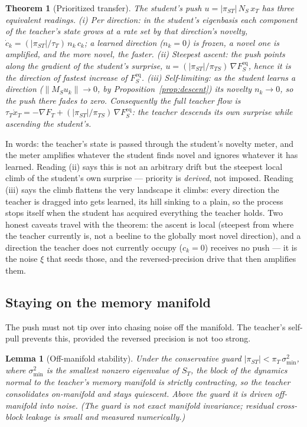 \documentclass[10pt,letterpaper]{article}
\theoremstyle{plain}
\newtheorem{theorem}{Theorem}
\newtheorem{lemma}{Lemma}
\theoremstyle{remark}
\newcommand{\xT}{x_T}
\newcommand{\MS}{M_S}
\newcommand{\ST}{S_T}
\newcommand{\NS}{N_S}
\newcommand{\FSeq}{F_S^{\mathrm{eq}}}
\newcommand{\FT}{F_T}
\newcommand{\piT}{\pi_T}
\newcommand{\piTS}{\pi_{TS}}
\newcommand{\piST}{\pi_{ST}}
\newcommand{\tauT}{\tau_T}
\begin{document}
\begin{theorem}[Prioritized transfer]
\label{thm:prioritized}
The student's push $u=|\piST|\,\NS\,\xT$ has three equivalent readings.
\emph{(i) Per direction:} in the student's eigenbasis each component of the teacher's state grows at a
rate set by that direction's novelty, $\dot c_k=(|\piST|/\tauT)\,n_k\,c_k$; a learned direction
($n_k=0$) is frozen, a novel one is amplified, and the more novel, the faster.
\emph{(ii) Steepest ascent:} the push points along the gradient of the student's surprise,
$u=(|\piST|/\piTS)\,\nabla\FSeq$, hence it is the direction of fastest increase of $\FSeq$.
\emph{(iii) Self-limiting:} as the student learns a direction ($\|\MS u_k\|\!\to\!0$, by
Proposition~\ref{prop:descent}) its novelty $n_k\!\to\!0$, so the push there fades to zero.
Consequently the full teacher flow is
$\tauT\dot\xT=-\nabla\FT+(|\piST|/\piTS)\,\nabla\FSeq$: the teacher descends its own surprise while
ascending the student's.
\end{theorem}

In words: the teacher's state is passed through the student's novelty meter, and the meter amplifies
whatever the student finds novel and ignores whatever it has learned. Reading (ii) says this is not an
arbitrary drift but the steepest local climb of the student's own surprise --- priority is
\emph{derived}, not imposed. Reading (iii) says the climb flattens the very landscape it climbs: every
direction the teacher is dragged into gets learned, its hill sinking to a plain, so the process stops
itself when the student has acquired everything the teacher holds. Two honest caveats travel with the
theorem: the ascent is local (steepest from where the teacher currently is, not a beeline to the globally
most novel direction), and a direction the teacher does not currently occupy ($c_k=0$) receives no push
--- it is the noise $\xi$ that seeds those, and the reversed-precision drive that then amplifies them.

\subsection{Staying on the memory manifold}
The push must not tip over into chasing noise off the manifold. The teacher's self-pull prevents this,
provided the reversed precision is not too strong.

\begin{lemma}[Off-manifold stability]
\label{lem:normal}
Under the conservative guard $|\piST| < \piT\,\sigma_{\min}^{2}$, where $\sigma_{\min}^{2}$ is the
smallest nonzero eigenvalue of $\ST$, the block of the dynamics normal to the teacher's memory manifold
is strictly contracting, so the teacher consolidates on-manifold and stays quiescent. Above the guard
it is driven off-manifold into noise. (The guard is not exact manifold invariance; residual cross-block
leakage is small and measured numerically.)
\end{lemma}
\end{document}
